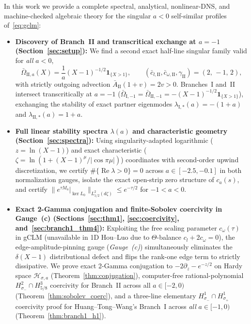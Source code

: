 \documentclass[11pt,a4paper]{article}
\begin{document}
In this work we provide a complete spectral, analytical, nonlinear-DNS, and machine-checked algebraic theory for the singular $a < 0$ self-similar profiles of~\eqref{eq:gclm}:
\begin{itemize}
  \item \textbf{Discovery of Branch~II and transcritical exchange at $a = -1$ (Section~\ref{sec:setup}):} We find a second exact half-line singular family valid for \emph{all} $a < 0$,
  \begin{equation}\label{eq:branch2}
  \bar\Omega_{\mathrm{II},a}(X) = \frac{1}{a}(X-1)^{-1/2}\mathbf{1}_{\{X>1\}}, \qquad (\bar c_{l,\mathrm{II}}, \bar c_{\omega,\mathrm{II}}, \gamma_{\mathrm{II}}) = (2,\,-1,\,2),
  \end{equation}
  with strictly outgoing advection $\bar A_{\mathrm{II}}(1+v) = 2v > 0$. Branches~I and~II intersect transcritically at $a = -1$ ($\bar\Omega_{\mathrm{I},-1} = \bar\Omega_{\mathrm{II},-1} = -(X-1)^{-1/2}\mathbf{1}_{\{X>1\}}$), exchanging the stability of exact partner eigenmodes $\lambda_{\mathrm{I},*}(a) = -(1+a)$ and $\lambda_{\mathrm{II},*}(a) = 1+a$.
  \item \textbf{Full linear stability spectra $\lambda(a)$ and characteristic geometry (Section~\ref{sec:spectra}):} Using singularity-adapted logarithmic ($z = \ln(X-1)$) and exact characteristic ($\zeta = \ln(1 + (X-1)^\mu/|\cos\pi\mu|)$) coordinates with second-order upwind discretization, we certify $\#\{\operatorname{Re}\lambda > 0\} = 0$ across $a \in [-2.5,-0.1]$ in both normalization gauges, isolate the exact open-strip zero structure of $c_a(s)$, and certify $\|e^{\tau M_a}|_{\ker L_0}\|_{L^2_{1/2}(d\zeta)} \le e^{-\tau/2}$ for $-1 < a < 0$.
  \item \textbf{Exact 2-Gamma conjugation and finite-Sobolev coercivity in Gauge~(c) (Sections~\ref{sec:thm1}, \ref{sec:coercivity}, and~\ref{sec:branch1_thm4}):} Exploiting the free scaling parameter $c_\omega(\tau)$ in gCLM (unavailable in 1D Hou--Luo due to $\Theta$-balance $c_l + 2c_\omega = 0$), the edge-amplitude-pinning gauge (\emph{Gauge~(c)}) simultaneously eliminates the $\delta(X-1)$ distributional defect and flips the rank-one edge term to strictly dissipative. We prove exact 2-Gamma conjugation to $-2\partial_z - e^{-z/2}$ on Hardy space $\mathcal{H}_{\sigma,a}$ (Theorem~\ref{thm:conjugation}), computer-free rational-polynomial $H^2_{\sigma_-} \cap H^3_{5/8}$ coercivity for Branch~II across all $a \in [-2,0)$ (Theorem~\ref{thm:sobolev_coerc}), and a three-line elementary $H^1_{\sigma_-} \cap H^1_{\sigma_+}$ coercivity proof for Huang--Tong--Wang's Branch~I across \emph{all} $a \in [-1,0)$ (Theorem~\ref{thm:branch1_h1}).

\end{itemize}
\end{document}
